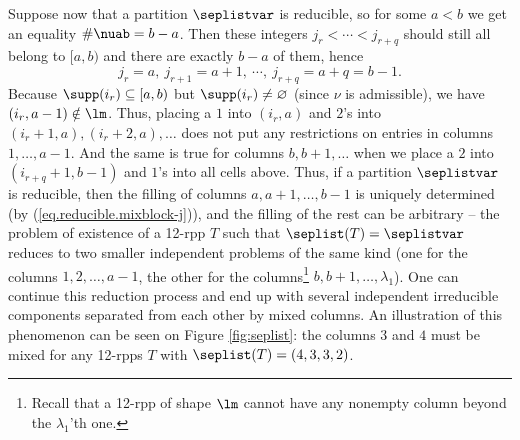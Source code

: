 \documentclass[numbers=enddot,12pt,final,onecolumn,notitlepage]{scrartcl}%
\theoremstyle{definition}
\begin{document}
Suppose now that a partition $\seplistvar$ is reducible, so for some $a<b$ we get an equality $\#\nuab=b-a$. Then these integers $j_r<\cdots<j_{r+q}$ should still all belong to $[a,b)$ and there are exactly $b-a$ of them, hence 
\begin{equation}
j_r=a,\ j_{r+1}=a+1,\ \cdots,\ j_{r+q}=a+q=b-1 .
\label{eq.reducible.mixblock-j}
\end{equation}
Because $\supp(i_r)\subseteq[a,b)$ but $\supp(i_r)\neq\varnothing$ (since $\nu$ is admissible), we have $(i_r,a-1)\notin\lm$. Thus, placing a $1$ into $(i_r,a)$ and $2$'s into $(i_r+1,a),(i_r+2,a),\dots$ does not put any restrictions on entries in columns $1,\dots, a-1$. And the same is true for columns $b,b+1,\dots$ when we place a $2$ into $(i_{r+q}+1,b-1)$ and $1$'s into all cells above. Thus, if a partition $\seplistvar$ is reducible, then the filling of columns $a,a+1,\dots, b-1$ is uniquely determined (by (\ref{eq.reducible.mixblock-j})), and the filling of the rest can be arbitrary -- the problem of existence of a 12-rpp $T$ such that $\seplist(T)=\seplistvar$ reduces to two smaller independent problems of the same kind (one for the columns $1,2,\ldots,a-1$, the other for the columns\footnote{Recall that a 12-rpp of shape $\lm$ cannot have any nonempty column beyond the $\lambda_1$'th one.} $b,b+1,\ldots,\lambda_1$). One can continue this reduction process and end up with several independent irreducible components separated from each other by mixed columns. An illustration of this phenomenon can be seen on Figure \ref{fig:seplist}: the columns $3$ and $4$ must be mixed for any 12-rpps $T$ with $\seplist(T)=(4,3,3,2)$.
\end{document}
